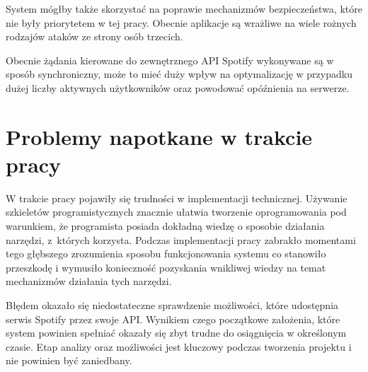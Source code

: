 System mógłby także skorzystać na poprawie mechanizmów bezpieczeństwa, które nie były priorytetem w tej pracy. Obecnie aplikacje są wrażliwe na wiele rożnych rodzajów ataków ze strony osób trzecich. 

Obecnie żądania kierowane do zewnętrznego API Spotify wykonywane są w sposób synchroniczny, może to mieć duży wpływ na optymalizację w przypadku dużej liczby aktywnych użytkowników oraz powodować opóźnienia na serwerze.

\section{Problemy napotkane w trakcie pracy}
W trakcie pracy pojawiły się trudności w implementacji technicznej. Używanie szkieletów programistycznych znacznie ułatwia tworzenie oprogramowania pod warunkiem, że programista posiada dokładną wiedzę o sposobie działania narzędzi, z~których korzysta. Podczas implementacji pracy zabrakło momentami tego głębszego zrozumienia sposobu funkcjonowania systemu co stanowiło przeszkodę i wymusiło konieczność pozyskania wnikliwej wiedzy na temat mechanizmów działania tych narzędzi.

Błędem okazało się niedostateczne sprawdzenie możliwości, które udostępnia serwis Spotify przez swoje API. Wynikiem czego początkowe założenia, które system powinien spełniać okazały się zbyt trudne do osiągnięcia w określonym czasie. Etap analizy oraz możliwości jest kluczowy podczas tworzenia projektu i nie powinien być zaniedbany.
